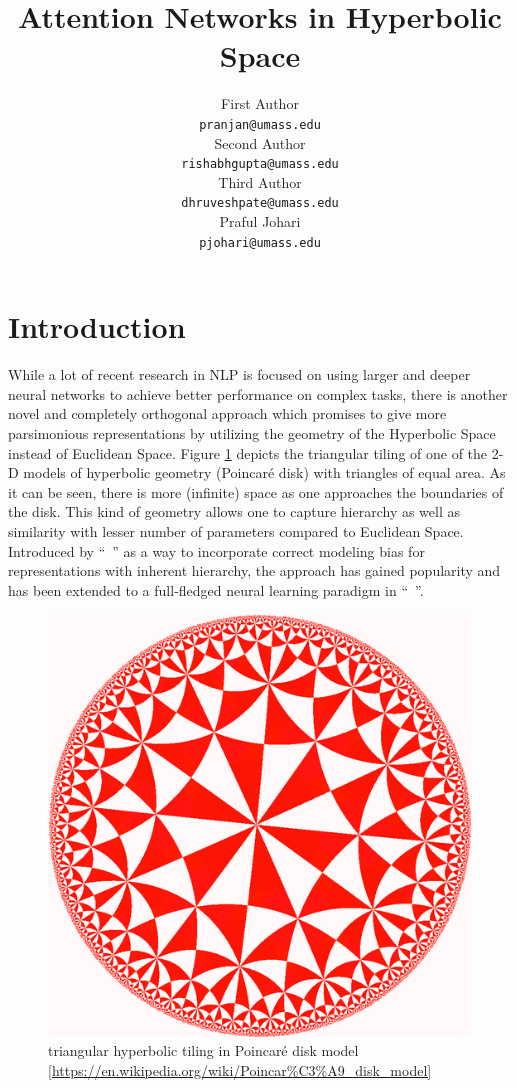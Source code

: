 \documentclass[11pt,a4paper]{article}
\title{Attention Networks in Hyperbolic Space}
\author{First Author \\
  {\tt pranjan@umass.edu} \\\And
  Second Author \\
  {\tt rishabhgupta@umass.edu} \\\And
  Third Author \\
  {\tt dhruveshpate@umass.edu} \\\And
  Praful Johari \\
  {\tt pjohari@umass.edu} \\}
\date{}
\newcommand{\figref}[1]{Figure \ref{#1}}
\begin{document}
\maketitle

\section{Introduction}

While a lot of recent research in NLP is focused on using larger and deeper neural networks to achieve better performance on complex tasks, there is another novel and completely orthogonal approach which promises to give more parsimonious representations by utilizing the geometry of the Hyperbolic Space instead of Euclidean Space. \figref{fig:poincare_disk} depicts the triangular tiling of one of the 2-D models of hyperbolic geometry (Poincar\'e disk) with triangles of equal area. As it can be seen, there is more (infinite) space as one approaches the boundaries of the disk. This kind of geometry allows one to capture hierarchy as well as similarity with lesser number of parameters compared to Euclidean Space.  Introduced by ``~'' as a way to incorporate correct modeling bias for representations with inherent hierarchy, the approach has gained popularity and has been extended to a full-fledged neural learning paradigm in ``~''. 

\begin{figure}
    \centering
    \includegraphics{figs/Hyperbolic_triangulation.png}
    \caption{triangular hyperbolic tiling in Poincar\'e disk model [\url{https://en.wikipedia.org/wiki/Poincar\%C3\%A9\_disk\_model]}}
    \label{fig:poincare_disk}
\end{figure}
\end{document}

